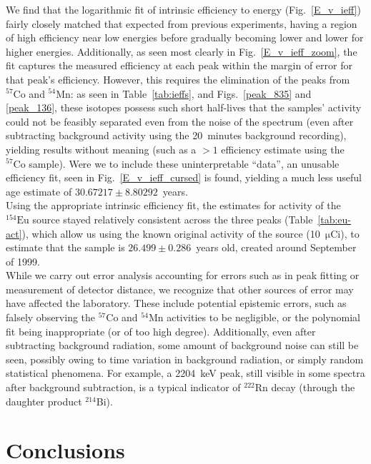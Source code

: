 \documentclass[12pt]{article}
\newcommand{\figref}[1]{Fig.~\ref{#1}}
\newcommand{\micCi}{$\mathrm{\mu Ci}$\xspace}
\newcommand{\MnSrc}{$\mathrm{^{54}Mn}$\xspace}
\newcommand{\CoSrcB}{$\mathrm{^{57}Co}$\xspace}
\newcommand{\EuSrc}{$\mathrm{^{154}Eu}$\xspace}
\begin{document}
We find that the logarithmic fit of intrinsic efficiency to energy (\figref{E_v_ieff}) fairly closely matched that expected from previous experiments\cite{npre_lab_7_manual_2025}, having a region of high efficiency near low energies before gradually becoming lower and lower for higher energies.
Additionally, as seen most clearly in \figref{E_v_ieff_zoom}, the fit captures the measured efficiency at each peak within the margin of error for that peak's efficiency.
However, this requires the elimination of the peaks from \CoSrcB and \MnSrc : as seen in Table~\ref{tab:ieffs}, and Figs.~\ref{peak_835} and \ref{peak_136}, these isotopes possess such short half-lives that the samples' activity could not be feasibly separated even from the noise of the spectrum (even after subtracting background activity using the 20~minutes background recording), yielding results without meaning (such as a $>1$ efficiency estimate using the \CoSrcB sample).
Were we to include these uninterpretable ``data'', an unusable efficiency fit, seen in \figref{E_v_ieff_cursed} is found, yielding a much less useful age estimate of $30.67217 \pm 8.80292$~years.\\

Using the appropriate intrinsic efficiency fit, the estimates for activity of the \EuSrc source stayed relatively consistent across the three peaks (Table~\ref{tab:eu-act}), which allow us using the known original activity of the source (10~\micCi), to estimate that the sample is $26.499 \pm 0.286$~years old, created around September of 1999.\\

While we carry out error analysis accounting for errors such as in peak fitting or measurement of detector distance, we recognize that other sources of error may have affected the laboratory.
These include potential epistemic errors, such as falsely observing the \CoSrcB and \MnSrc activities to be negligible, or the polynomial fit being inappropriate (or of too high degree).
Additionally, even after subtracting background radiation, some amount of background noise can still be seen, possibly owing to time variation in background radiation, or simply random statistical phenomena.
For example, a 2204~keV peak, still visible in some spectra after background subtraction, is a typical indicator of $^{222}$Rn decay (through the daughter product $^{214}$Bi)\cite{phillips_primer_nodate}.

\section{Conclusions}\label{sec:conc}
\end{document}
